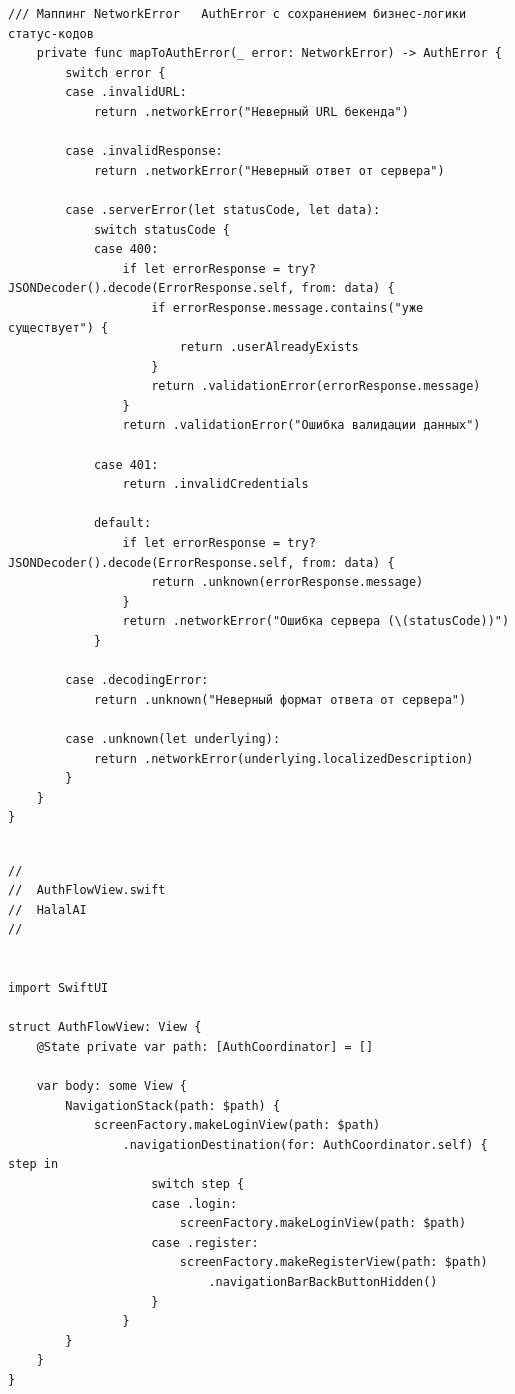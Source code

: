 \begin{lstlisting}[basicstyle=\tiny\ttfamily,breaklines=true]
    /// Маппинг NetworkError   AuthError с сохранением бизнес-логики статус-кодов
    private func mapToAuthError(_ error: NetworkError) -> AuthError {
        switch error {
        case .invalidURL:
            return .networkError("Неверный URL бекенда")

        case .invalidResponse:
            return .networkError("Неверный ответ от сервера")

        case .serverError(let statusCode, let data):
            switch statusCode {
            case 400:
                if let errorResponse = try? JSONDecoder().decode(ErrorResponse.self, from: data) {
                    if errorResponse.message.contains("уже существует") {
                        return .userAlreadyExists
                    }
                    return .validationError(errorResponse.message)
                }
                return .validationError("Ошибка валидации данных")

            case 401:
                return .invalidCredentials

            default:
                if let errorResponse = try? JSONDecoder().decode(ErrorResponse.self, from: data) {
                    return .unknown(errorResponse.message)
                }
                return .networkError("Ошибка сервера (\(statusCode))")
            }

        case .decodingError:
            return .unknown("Неверный формат ответа от сервера")

        case .unknown(let underlying):
            return .networkError(underlying.localizedDescription)
        }
    }
}
\end{lstlisting}

\begin{lstlisting}[basicstyle=\tiny\ttfamily,breaklines=true]

//
//  AuthFlowView.swift
//  HalalAI
//


import SwiftUI

struct AuthFlowView: View {
    @State private var path: [AuthCoordinator] = []
    
    var body: some View {
        NavigationStack(path: $path) {
            screenFactory.makeLoginView(path: $path)
                .navigationDestination(for: AuthCoordinator.self) { step in
                    switch step {
                    case .login:
                        screenFactory.makeLoginView(path: $path)
                    case .register:
                        screenFactory.makeRegisterView(path: $path)
                            .navigationBarBackButtonHidden()
                    }
                }
        }
    }
}
\end{lstlisting}

